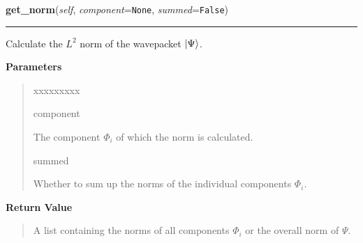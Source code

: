 \hspace{.8\funcindent}\begin{boxedminipage}{\funcwidth}

    \raggedright \textbf{get\_norm}(\textit{self}, \textit{component}={\tt None}, \textit{summed}={\tt False})

    \vspace{-1.5ex}

    \rule{\textwidth}{0.5\fboxrule}
\setlength{\parskip}{2ex}
    Calculate the $L^2$ norm of the wavepacket
    $\Ket{\Psi}$.

\setlength{\parskip}{1ex}
      \textbf{Parameters}
      \vspace{-1ex}

      \begin{quote}
        \begin{Ventry}{xxxxxxxxx}

          \item[component]

          The component $\Phi_i$ of which the norm is
          calculated.

          \item[summed]

          Whether to sum up the norms of the individual components
          $\Phi_i$.

        \end{Ventry}

      \end{quote}

      \textbf{Return Value}
    \vspace{-1ex}

      \begin{quote}
      A list containing the norms of all components
      $\Phi_i$ or the overall norm of
      $\Psi$.

      \end{quote}

    \end{boxedminipage}

    \label{HagedornMultiWavepacket:HagedornMultiWavepacket:potential_energy}

    \vspace{0.5ex}

